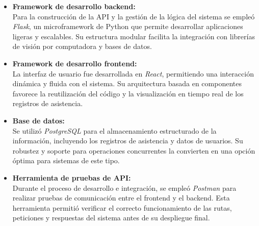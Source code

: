 \begin{itemize}
\begin{table}[H]
    \centering
    \caption{Comparativa de modelos de DeepFace \cite{yolov8face2024}.}
    \label{tab:deepface2}
    \renewcommand{\arraystretch}{1.25}
\end{table}



\item \textbf{Framework de desarrollo backend:} \\
Para la construcción de la API y la gestión de la lógica del sistema se empleó \textit{Flask}, un microframework de Python que permite desarrollar aplicaciones ligeras y escalables. Su estructura modular facilita la integración con librerías de visión por computadora y bases de datos.

\item \textbf{Framework de desarrollo frontend:} \\
La interfaz de usuario fue desarrollada en \textit{React}, permitiendo una interacción dinámica y fluida con el sistema. Su arquitectura basada en componentes favorece la reutilización del código y la visualización en tiempo real de los registros de asistencia.

\item \textbf{Base de datos:} \\
Se utilizó \textit{PostgreSQL} para el almacenamiento estructurado de la información, incluyendo los registros de asistencia y datos de usuarios. Su robustez y soporte para operaciones concurrentes la convierten en una opción óptima para sistemas de este tipo.

\item \textbf{Herramienta de pruebas de API:} \\
Durante el proceso de desarrollo e integración, se empleó \textit{Postman} para realizar pruebas de comunicación entre el frontend y el backend. Esta herramienta permitió verificar el correcto funcionamiento de las rutas, peticiones y respuestas del sistema antes de su despliegue final.

\end{itemize}

